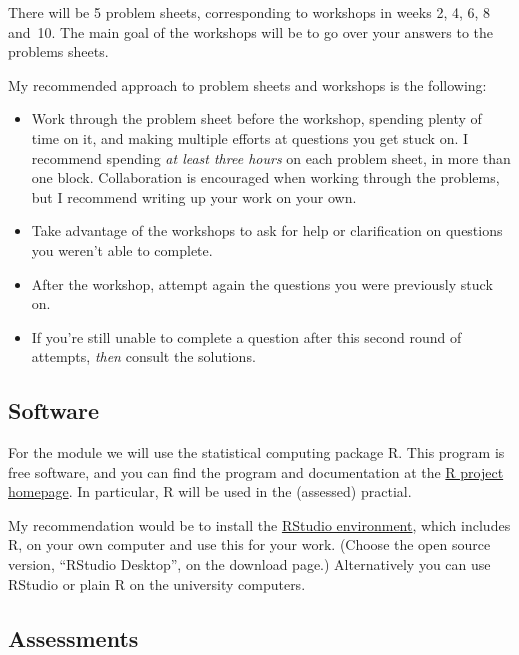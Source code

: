 \documentclass[
  a4paper,
]{article}
\providecommand{\tightlist}{%
  \setlength{\itemsep}{0pt}\setlength{\parskip}{0pt}}
\theoremstyle{definition}
\theoremstyle{definition}
\theoremstyle{definition}
\theoremstyle{definition}
\theoremstyle{remark}
\begin{document}
There will be 5 problem sheets, corresponding to workshops in weeks 2,
4, 6, 8 and~10. The main goal of the workshops will be to go over
your answers to the problems sheets.

My recommended approach to problem sheets and workshops is the following:

\begin{itemize}
\tightlist
\item
  Work through the problem sheet before the workshop, spending plenty
  of time on it, and making multiple efforts at questions you get
  stuck on. I recommend spending \emph{at least three hours} on each
  problem sheet, in more than one block. Collaboration is encouraged
  when working through the problems, but I recommend writing up your
  work on your own.
\item
  Take advantage of the workshops to ask for help or clarification on
  questions you weren't able to complete.
\item
  After the workshop, attempt again the questions you were previously stuck on.
\item
  If you're still unable to complete a question after this second
  round of attempts, \emph{then} consult the solutions.
\end{itemize}

\hypertarget{software}{%
\subsection*{Software}\label{software}}

For the module we will use the statistical computing package R. This
program is free software, and you can find the program and
documentation at the \href{https://www.r-project.org/}{R project homepage}.
In particular, R will be used in the (assessed) practial.

My recommendation would be to install the \href{https://www.rstudio.com/}{RStudio
environment}, which includes R, on your own
computer and use this for your work. (Choose the open source
version, ``RStudio Desktop'', on the download page.) Alternatively you
can use RStudio or plain R on the university computers.

\hypertarget{assessments}{%
\subsection*{Assessments}\label{assessments}}
\end{document}
